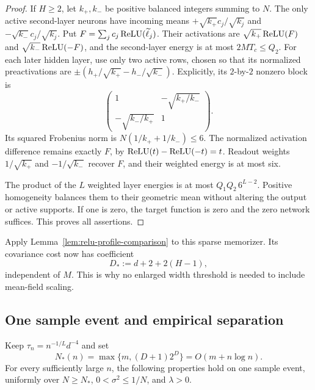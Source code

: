 \begin{proof}
If $H\ge2$, let $k_+,k_-$ be positive balanced integers summing to
$N$. The only active second-layer neurons have incoming means
$+\sqrt{k_+}c_j/\sqrt{k_j}$ and
$-\sqrt{k_-}c_j/\sqrt{k_j}$. Put
$F=\sum_jc_j\operatorname{ReLU}(\widetilde\ell_j)$.
Their activations are $\sqrt{k_+}\operatorname{ReLU}(F)$ and
$\sqrt{k_-}\operatorname{ReLU}(-F)$, and the second-layer energy is at most
$2MT_c\le Q_2$.
For each later hidden layer, use only two active rows, chosen so that
its normalized preactivations are $\pm(h_+/\sqrt{k_+}-h_-/\sqrt{k_-})$.
Explicitly, its $2$-by-$2$ nonzero block is
\[
 \begin{pmatrix}
 1&-\sqrt{k_+/k_-}\\
 -\sqrt{k_-/k_+}&1
 \end{pmatrix}.
\]
Its squared Frobenius norm is
$N(1/k_++1/k_-)\le6$. The normalized activation difference remains
exactly $F$, by $\operatorname{ReLU}(t)-\operatorname{ReLU}(-t)=t$.
Readout weights $1/\sqrt{k_+}$ and $-1/\sqrt{k_-}$ recover $F$,
and their weighted energy is at most six.

The product of the $L$ weighted layer energies is at most
$Q_1Q_2\,6^{L-2}$. Positive homogeneity balances them to their
geometric mean without altering the output or active supports. If
one is zero, the target function is zero and the zero network suffices.
This proves all assertions.
\end{proof}

Apply Lemma~\ref{lem:relu-profile-comparison} to this sparse
memorizer. Its covariance cost now has coefficient
\[
 D_*:=d+2+2(H-1),
\]
independent of $M$. This is why no enlarged width threshold is
needed to include mean-field scaling.

\subsection{One sample event and empirical separation}

Keep $\tau_n=n^{-1/L}d^{-4}$ and set
\[
 N_*(n)=\max\{m,(D+1)2^D\}=O(m+n\log n).
\]
For every sufficiently large $n$, the following properties hold on
one sample event, uniformly over $N\ge N_*$,
$0<\sigma^2\le1/N$, and $\lambda>0$.

